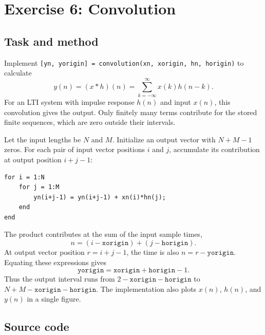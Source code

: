 \section{Exercise 6: Convolution}
\subsection{Task and method}
Implement \texttt{[yn, yorigin] = convolution(xn, xorigin, hn, horigin)}
to calculate
\begin{equation}
  y(n)=(x*h)(n)=\sum_{k=-\infty}^{\infty}x(k)h(n-k).
\end{equation}
For an LTI system with impulse response $h(n)$ and input $x(n)$,
this convolution gives the output. Only finitely many terms contribute
for the stored finite sequences, which are zero outside their intervals.

Let the input lengths be $N$ and $M$. Initialize an output vector with
$N+M-1$ zeros. For each pair of input vector positions $i$ and $j$,
accumulate its contribution at output position $i+j-1$:
\begin{lstlisting}[numbers=none]
for i = 1:N
    for j = 1:M
        yn(i+j-1) = yn(i+j-1) + xn(i)*hn(j);
    end
end
\end{lstlisting}
The product contributes at the sum of the input sample times,
\begin{equation}
  n=(i-\texttt{xorigin})+(j-\texttt{horigin}).
\end{equation}
At output vector position $r=i+j-1$, the time is also
$n=r-\texttt{yorigin}$. Equating these expressions gives
\begin{equation}
  \texttt{yorigin}=\texttt{xorigin}+\texttt{horigin}-1.
\end{equation}
Thus the output interval runs from $2-\texttt{xorigin}-\texttt{horigin}$
to $N+M-\texttt{xorigin}-\texttt{horigin}$. The implementation also
plots $x(n)$, $h(n)$, and $y(n)$ in a single figure.

\subsection{Source code}


